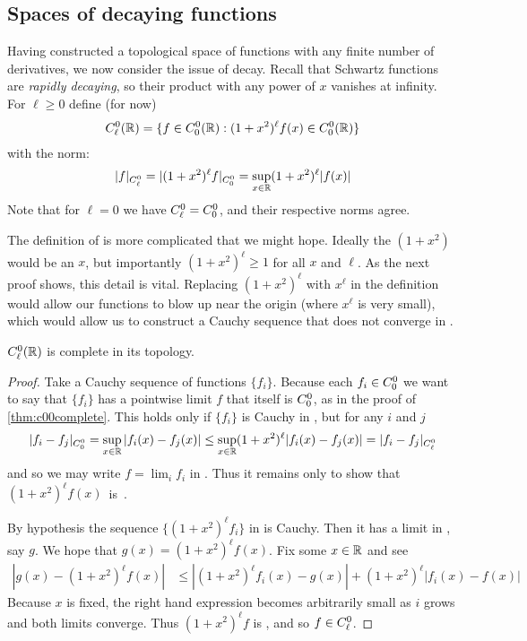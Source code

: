     \subsection{Spaces of decaying functions}
      \label{sec:decayfunc}
      Having constructed a topological space of functions with any finite number of derivatives, we now consider the issue of decay.
      Recall that Schwartz functions are \emph{rapidly decaying}, so their product with any power of $x$ vanishes at infinity.
      For $\ell\ge0$ define (for now)
      \begin{align*}
        {C^0_\ell}(\mathbb{R}) = \{f\in {C^0_0}(\mathbb{R}):(1+x^2)^\ell f(x)\in {C^0_0}(\mathbb{R})\}
      \end{align*}
      with the norm:
      \begin{align*}
        |f|_{C^0_\ell} = |(1+x^2)^\ell f|_{{C^0_0}} = \sup_{x\in\mathbb{R}} (1+x^2)^\ell|f(x)|
      \end{align*}
      Note that for $\ell=0$ we have ${C^0_\ell}={C^0_0}$, and their respective norms agree.

      The definition of \Cl is more complicated that we might hope.
      Ideally the $(1+x^2)$ would be an $x$, but importantly $(1+x^2)^\ell\ge1$ for all $x$ and $\ell$.
      As the next proof shows, this detail is vital.
      Replacing $(1+x^2)^\ell$ with $x^\ell$ in the definition would allow our functions to blow up near the origin (where $x^\ell$ is very small), which would allow us to construct a Cauchy sequence that does not converge in \Cl.
      \begin{thm}
        \label{thm:c0lcomplete}
        ${C^0_\ell}(\mathbb{R})$ is complete in its topology.
      \end{thm}
      \begin{proof}
        Take a Cauchy sequence of \Cl functions $\{f_i\}$.
        Because each $f_i\in {C^0_0}$ we want to say that $\{f_i\}$ has a pointwise limit $f$ that itself is ${C^0_0}$, as in the proof of \cref{thm:c00complete}.
        This holds only if $\{f_i\}$ is Cauchy in \Coo, but for any $i$ and $j$ 
        \begin{align*}
          |f_i-f_j|_{C^0_0}
          = \sup_{x\in\mathbb{R}}|f_i(x)-f_j(x)|
          \le \sup_{x\in\mathbb{R}}(1+x^2)^\ell|f_i(x)-f_j(x)|
          =|f_i-f_j|_{C^0_\ell}
        \end{align*}
        and so we may write $f=\lim_i f_i$ in \Coo.
        Thus it remains only to show that $(1+x^2)^\ell f(x)$~is~\Coo.
        
        By hypothesis the sequence $\{(1+x^2)^\ell f_i\}$ in \Coo is Cauchy.
        Then it has a limit in \Coo, say $g$.
        We hope that $g(x)=(1+x^2)^\ell f(x)$.
        Fix some $x\in\mathbb{R}$ and see
        \begin{align*}
          |g(x) - (1+x^2)^\ell f(x)| &\le |(1+x^2)^\ell f_i(x) - g(x)|+(1+x^2)^\ell|f_i(x)-f(x)|
        \end{align*}
        Because $x$ is fixed, the right hand expression becomes arbitrarily small as $i$ grows and both limits converge.
        Thus $(1+x^2)^\ell f$ is \Coo, and so $f\in{C^0_\ell}$.
      \end{proof}

